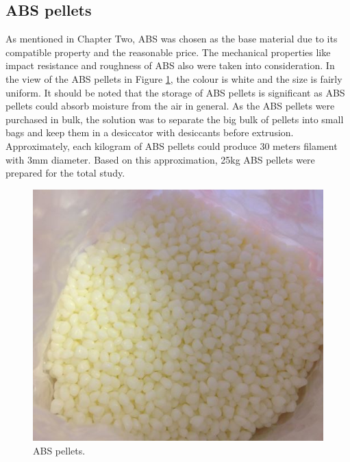 \subsection{ABS pellets}
As mentioned in Chapter Two, ABS was chosen as the base material due to its compatible property and the reasonable price. The mechanical properties like impact resistance and roughness\cite{swetham2017critical} of ABS also were taken into consideration.
In the view of the ABS pellets in Figure \ref{Fig:ABS pellets}, the colour is white and the size is fairly uniform. It should be noted that the storage of ABS pellets is significant as ABS pellets could absorb moisture from the air in general. As the ABS pellets were purchased in bulk, the solution was to separate the big bulk of pellets into small bags and keep them in a desiccator with desiccants before extrusion. Approximately, each kilogram of ABS pellets could produce 30 meters filament with 3mm diameter. Based on this approximation, 25kg ABS pellets were prepared for the total study.

\begin{figure}[t]
  \centering
  \includegraphics[scale=0.5]{Figs3//ABS_pellets.JPG}
  \caption[ABS pellets]{\footnotesize ABS pellets.}
  \label{Fig:ABS pellets}
\end{figure}

